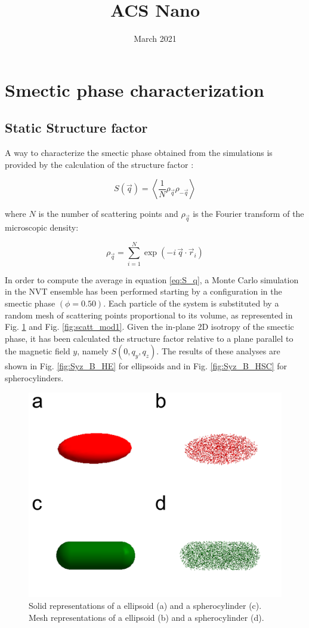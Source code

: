 \documentclass{article}
\title{ACS Nano}
\date{March 2021}
\begin{document}
\maketitle

\section{Smectic phase characterization}

\subsection{Static Structure factor}

A way to characterize the smectic phase obtained from the simulations is provided by the calculation of the structure factor \cite{Hansen_McDonald}:

\begin{equation}\label{eq:S_q}
    S( \vec{q} ) = \left\langle \frac{1}{N} \rho_{\vec{q}} \rho_{-\vec{q}} \right\rangle 
\end{equation}

where $N$ is the number of scattering points and $\rho_{\vec{q}}$ is the Fourier transform of the microscopic density:

\begin{equation}
    \rho_{\vec{q}} = \sum_{i=1}^N \exp(-i\, \vec{q} \cdot \vec{r}_i)
\end{equation}

In order to compute the average in equation \ref{eq:S_q}, a Monte Carlo simulation in the NVT ensemble has been performed starting by a configuration in the smectic phase $(\phi = 0.50)$. Each particle of the system is substituted by a random mesh of scattering points proportional to its volume, as represented in Fig. \ref{fig:scatt_mod_single} and Fig. \ref{fig:scatt_mod1}. Given the in-plane 2D isotropy of the smectic phase, it has been calculated the structure factor relative to a plane parallel to the magnetic field $y$, namely $S(0, q_y, q_z)$. The results of these analyses are shown in Fig. \ref{fig:Syz_B_HE} for ellipsoids and in Fig. \ref{fig:Syz_B_HSC} for spherocylinders.

\begin{figure}
    \centering
    \includegraphics[width=0.5\columnwidth]{Scatteringmodel_single.png}
    \caption{Solid representations of a ellipsoid (a) and a spherocylinder (c). Mesh representations of a ellipsoid (b) and a spherocylinder (d).}
    \label{fig:scatt_mod_single}
\end{figure}
\end{document}
